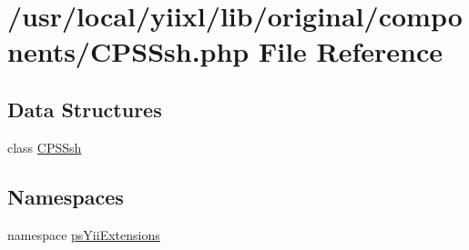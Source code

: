 \hypertarget{CPSSsh_8php}{
\section{/usr/local/yiixl/lib/original/components/CPSSsh.php File Reference}
\label{CPSSsh_8php}
}
\subsection*{Data Structures}
\begin{DoxyCompactItemize}
\item 
class \hyperlink{classCPSSsh}{CPSSsh}
\end{DoxyCompactItemize}
\subsection*{Namespaces}
\begin{DoxyCompactItemize}
\item 
namespace \hyperlink{namespacepsYiiExtensions}{psYiiExtensions}
\end{DoxyCompactItemize}
